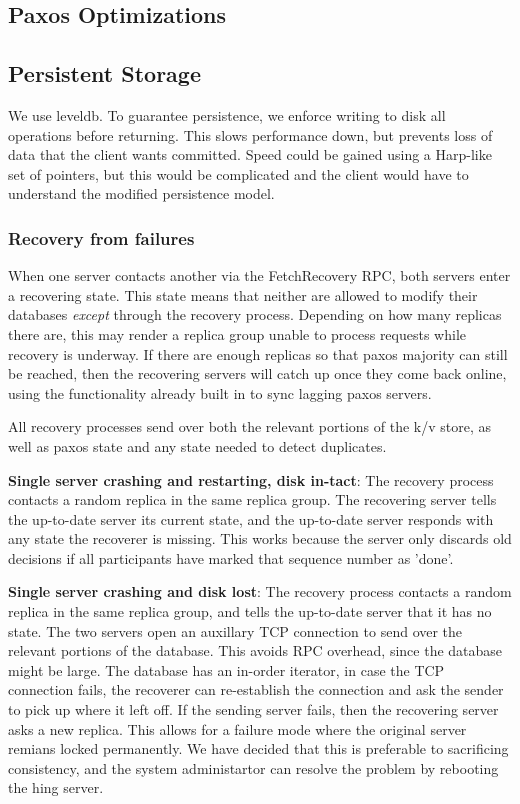 \documentclass[letterpaper,10pt]{article}
\begin{document}
\subsection{Paxos Optimizations}

\subsection{Persistent Storage}
We use leveldb. To guarantee persistence, we enforce writing to disk
all operations before returning. This slows performance down, but
prevents loss of data that the client wants committed. Speed could be
gained using a Harp-like set of pointers, but this would be
complicated and the client would have to understand the modified
persistence model.

\subsubsection{Recovery from failures}

When one server contacts another via the FetchRecovery RPC, both
servers enter a recovering state. This state means that neither are
allowed to modify their databases \emph{except} through the recovery
process. Depending on how many replicas there are, this may render a
replica group unable to process requests while recovery is underway.
If there are enough replicas so that paxos majority can still be
reached, then the recovering servers will catch up once they come back
online, using the functionality already built in to sync lagging paxos
servers.

All recovery processes send over both the relevant portions of the k/v
store, as well as paxos state and any state needed to detect
duplicates.

\textbf{Single server crashing and restarting, disk in-tact}: The
recovery process contacts a random replica in the same replica group.
The recovering server tells the up-to-date server its current state,
and the up-to-date server responds with any state the recoverer is
missing. This works because the server only discards old decisions if
all participants have marked that sequence number as 'done'.

\textbf{Single server crashing and disk lost}: The recovery process
contacts a random replica in the same replica group, and tells the
up-to-date server that it has no state. The two servers open an
auxillary TCP connection to send over the relevant portions of the
database. This avoids RPC overhead, since the database might be large.
The database has an in-order iterator, in case the TCP connection
fails, the recoverer can re-establish the connection and ask the
sender to pick up where it left off. If the sending server fails, then
the recovering server asks a new replica. This allows for a failure
mode where the original server remians locked permanently. We have
decided that this is preferable to sacrificing consistency, and the
system administartor can resolve the problem by rebooting the hing
server.
\end{document}

